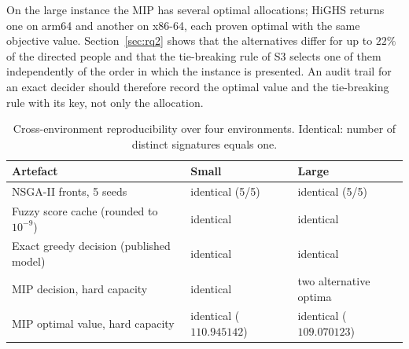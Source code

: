 \documentclass[systems,article,accept,moreauthors,pdftex]{Definitions/mdpi}
\begin{document}
On the large instance the MIP has several optimal allocations; HiGHS returns one on arm64 and
another on x86-64, each proven optimal with the same objective value. Section~\ref{sec:rq2} shows
that the alternatives differ for up to $22\%$ of the directed people and that the tie-breaking
rule of S3 selects one of them independently of the order in which the instance is presented. An
audit trail for an exact decider should therefore record the optimal value and the tie-breaking
rule with its key, not only the allocation.

\begin{table}[H]

\caption{Cross-environment reproducibility over four environments. Identical: number of
distinct signatures equals one.\label{tab:crossenv}}
\small
\begin{tabularx}{\textwidth}{Lll}
\toprule
\textbf{Artefact} & \textbf{Small} & \textbf{Large}\\
\midrule
NSGA-II fronts, 5 seeds & identical (5/5) & identical (5/5)\\
Fuzzy score cache (rounded to $10^{-9}$) & identical & identical\\
Exact greedy decision (published model) & identical & identical\\
MIP decision, hard capacity & identical & two alternative optima\\
MIP optimal value, hard capacity & identical ($110.945142$) & identical ($109.070123$)\\
\bottomrule
\end{tabularx}
\end{table}





\end{document}
